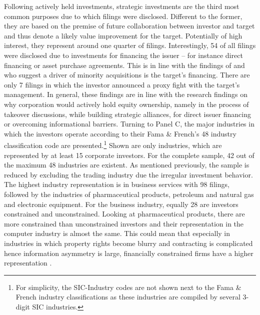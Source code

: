 \documentclass[12pt]{article}
\begin{document}
Following actively held investments, strategic investments are the third most common purposes due to which filings were disclosed. Different to the former, they are based on the premise of future collaboration between investor and target and thus denote a likely value improvement for the target. Potentially of high interest, they represent around one quarter of filings. Interestingly, 54 of all filings were disclosed due to investments for financing the issuer -- for instance direct financing or asset purchase agreements. This is in line with the findings of \citet[p.2792]{Allen2000} and \citet[p.78]{Liao2014} who suggest a driver of minority acquisitions is the target's financing. There are only 7 filings in which the investor announced a proxy fight with the target's management. In general, these findings are in line with the research findings on why corporation would actively hold equity ownership, namely in the process of takeover discussions, while building strategic alliances, for direct issuer financing or overcoming informational barriers.
Turning to Panel C, the major industries in which the investors operate according to their Fama \& French's 48 industry classification code are presented.\footnote{For simplicity, the SIC-Industry codes are not shown next to the Fama \& French industry classifications as these industries are compiled by several 3-digit SIC industries.} Shown are only industries, which are represented by at least 15 corporate investors. For the complete sample, 42 out of the maximum 48 industries are existent. As mentioned previously, the sample is reduced by excluding the trading industry due the irregular investment behavior. The highest industry representation is in business services with 98 filings, followed by the industries of pharmaceutical products, petroleum and natural gas and electronic equipment. For the business industry, equally 28 are investors constrained and unconstrained. Looking at pharmaceutical products, there are more constrained than unconstrained investors and their representation in the computer industry is almost the same. This could mean that especially in industries in which property rights become blurry and contracting is complicated hence information asymmetry is large, financially constrained firms have a higher representation \citep[p.4]{Liao2014}.
\end{document}
